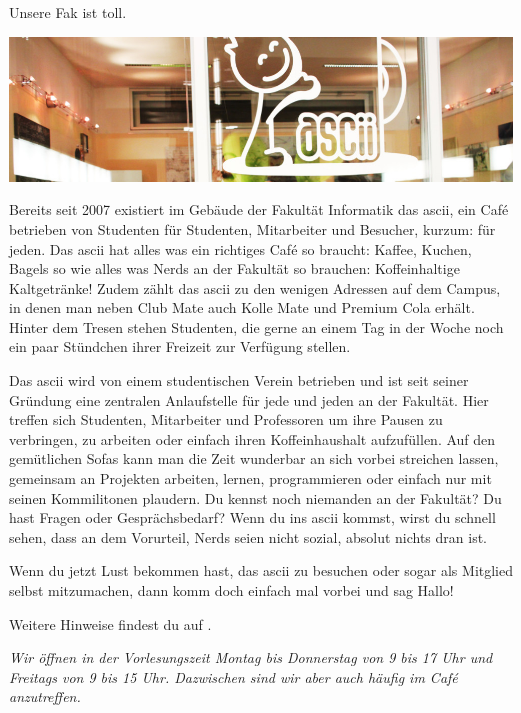 
Unsere Fak ist toll.

\pagebreak


\includegraphics[width=\linewidth]{img/ascii.jpg}

Bereits seit 2007 existiert im Gebäude der Fakultät Informatik das ascii, ein Café betrieben von Studenten für Studenten, Mitarbeiter und Besucher, kurzum: für jeden.
Das ascii hat alles was ein richtiges Café so braucht: Kaffee, Kuchen, Bagels so wie alles was Nerds an der Fakultät so brauchen: Koffeinhaltige Kaltgetränke!
Zudem zählt das ascii zu den wenigen Adressen auf dem Campus, in denen man neben Club Mate auch Kolle Mate und Premium Cola erhält.
Hinter dem Tresen stehen Studenten, die gerne an einem Tag in der Woche noch ein paar Stündchen ihrer Freizeit zur Verfügung stellen.

Das ascii wird von einem studentischen Verein betrieben und ist seit seiner Gründung eine zentralen Anlaufstelle für jede und jeden an der Fakultät.
Hier treffen sich Studenten, Mitarbeiter und Professoren um ihre Pausen zu verbringen,
zu arbeiten oder einfach ihren Koffeinhaushalt aufzufüllen.
Auf den gemütlichen Sofas kann man die Zeit wunderbar an sich vorbei streichen lassen,
gemeinsam an Projekten arbeiten, lernen, programmieren oder einfach nur mit seinen Kommilitonen plaudern.
Du kennst noch niemanden an der Fakultät?
Du hast Fragen oder Gesprächsbedarf?
Wenn du ins ascii kommst, wirst du schnell sehen, dass an dem Vorurteil, Nerds seien nicht sozial, absolut nichts dran ist.

Wenn du jetzt Lust bekommen hast, das ascii zu besuchen oder sogar als Mitglied selbst mitzumachen, dann komm doch einfach mal vorbei und sag Hallo!

Weitere Hinweise findest du auf .

\textit{Wir öffnen in der Vorlesungszeit Montag bis Donnerstag von 9 bis 17 Uhr und Freitags von 9 bis 15 Uhr. Dazwischen sind wir aber auch häufig im Café anzutreffen.}

